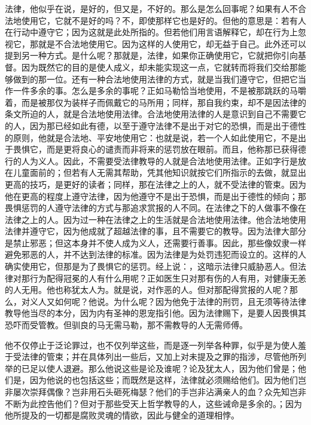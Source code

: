 法律，他似乎在说，是好的，但又是，不好的。那么是怎么回事呢？如果有人不合法地使用它，它就不是好的吗？不，即使那样它也是好的。但他的意思是：若有人在行动中遵守它；因为这就是此处所指的。但若他们用言语解释它，却在行为上忽视它，那就是不合法地使用它。因为这样的人使用它，却无益于自己。此外还可以提到另一种方式。是什么呢？那就是，法律，如果你正确使用它，它就把你引向基督。因为既然它的目的是使人成义，却未能实现这一点，它就转而将我们交给那能够做到的那一位。还有一种合法地使用法律的方式，就是当我们遵守它，但把它当作一件多余的事。怎么是多余的事呢？正如马勒恰当地使用，不是被那跳跃的马嚼着，而是被那仅为装样子而佩戴它的马所用；同样，那自我约束，却不是因法律的条文所迫的人，就是合法地使用法律。合法地使用法律的人是意识到自己不需要它的人，因为那已经如此有德，以至于遵守法律不是出于对它的恐惧，而是出于德性的原则，他就是合法地、平安地使用它：也就是说，若一个人如此使用它，不是出于畏惧它，而是更将良心的谴责而非将来的惩罚放在眼前。而且，他称那已获得德行的人为义人。因此，不需要受法律教导的人就是合法地使用法律。正如字行是放在儿童面前的；但若有人无需其帮助，凭其他知识就按它们所指示的去做，就显出更高的技巧，是更好的读者；同样，那在法律之上的人，就不受法律的管束。因为他在更高的程度上遵守法律，因为他遵守不是出于恐惧，而是出于德性的倾向；那畏惧惩罚的人遵守法律的方式与那追求赏报的人不同。在法律之下的人做事不像在法律之上的人。因为过一种在法律之上的生活就是合法地使用法律。他合法地使用法律并遵守它，因为他成就了超越法律的事，且不需要它的教导。因为法律大部分是禁止邪恶；但这本身并不使人成为义人，还需要行善事。因此，那些像奴隶一样避免邪恶的人，并不达到法律的标准。因为法律是为处罚违犯而设立的。这样的人确实使用它，但那是为了畏惧它的惩罚。经上说：，这暗示法律只威胁恶人。但法律对那行为配得冠冕的人有什么用呢？正如医生只对那有伤的人有用，对健康无恙的人无用。他也称犹太人为。就是说，对作恶的人。但对那配得赏报的人呢？那么，对义人又如何呢？他说。为什么呢？因为他免于法律的刑罚，且无须等待法律教导他当尽的本分，因为内有圣神的恩宠指引他。因为法律赐下，是要人因畏惧其恐吓而受管教。但驯良的马无需马勒，那不需教导的人无需师傅。\par

他不仅停止于泛论罪过，也不仅列举这些，而是逐一列举各种罪，似乎是为使人羞于受法律的管束；并在具体列出一些后，又加上对未提及之罪的指涉，尽管他所列举的已足以使人退避。那么他说这些是论及谁呢？论及犹太人，因为他们曾是；他们是，因为他说的也包括这些；而既然是这样，法律就必须赐给他们。因为他们岂非屡次崇拜偶像？岂非用石头砸死梅瑟？他们的手岂非沾满亲人的血？众先知岂非不断为此控告他们？但对于那些受天上哲学教导的人，这些诫命是多余的。；因为他所提及的一切都是腐败灵魂的情欲，因此与健全的道理相悖。\par

